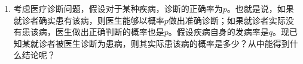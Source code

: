 \documentclass[12pt]{article}
\newcommand{\hei}{\CJKfamily{hei}}                          %
\begin{document}
\begin{enumerate}
\item {\hei 考虑医疗诊断问题，假设对于某种疾病，诊断的正确率为$p$。也就是说，如果就诊者确实患有该病，则医生能够以概率$p$做出准确诊断；如果就诊者实际没有患该病，医生做出正确判断的概率也是$p$。假设疾病自身的发病率是$q$。现已知某就诊者被医生诊断为患病，则其实际患该病的概率是多少？从中能得到什么结论呢？}



\end{enumerate}
\end{document}
